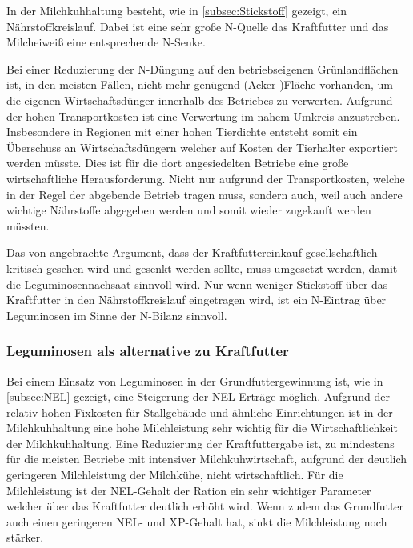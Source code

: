 In der Milchkuhhaltung besteht, wie in \cref{subsec:Stickstoff} gezeigt, ein Nährstoffkreislauf.
Dabei ist eine sehr große N-Quelle das Kraftfutter und das Milcheiweiß eine entsprechende N-Senke.

Bei einer Reduzierung der N-Düngung auf den betriebseigenen Grünlandflächen ist, in den meisten Fällen, nicht mehr genügend (Acker-)Fläche vorhanden, um die eigenen Wirtschaftsdünger innerhalb des Betriebes zu verwerten.
Aufgrund der hohen Transportkosten ist eine Verwertung im nahem Umkreis anzustreben.
Insbesondere in Regionen mit einer hohen Tierdichte entsteht somit ein Überschuss an Wirtschaftsdüngern welcher auf Kosten der Tierhalter exportiert werden müsste.
Dies ist für die dort angesiedelten Betriebe eine große wirtschaftliche Herausforderung.
Nicht nur aufgrund der Transportkosten, welche in der Regel der abgebende Betrieb tragen muss, sondern auch, weil auch andere wichtige Nährstoffe abgegeben werden und somit wieder zugekauft werden müssten.

Das von \textcite[33]{weggler2050leguminosen} angebrachte Argument, dass der Kraftfuttereinkauf gesellschaftlich kritisch gesehen wird und gesenkt werden sollte, muss umgesetzt werden, damit die Leguminosennachsaat sinnvoll wird.
Nur wenn weniger Stickstoff über das Kraftfutter in den Nährstoffkreislauf eingetragen wird, ist ein N-Eintrag über Leguminosen im Sinne der N-Bilanz sinnvoll.

\subsubsection{Leguminosen als alternative zu Kraftfutter}
\label{subsub:alternative}
Bei einem Einsatz von Leguminosen in der Grundfuttergewinnung ist, wie in \cref{subsec:NEL} gezeigt, eine Steigerung der \ac{NEL}-Erträge möglich.
Aufgrund der relativ hohen Fixkosten für Stallgebäude und ähnliche Einrichtungen ist in der Milchkuhhaltung eine hohe Milchleistung sehr wichtig für die Wirtschaftlichkeit der Milchkuhhaltung.
Eine Reduzierung der Kraftfuttergabe ist, zu mindestens für die meisten Betriebe mit intensiver Milchkuhwirtschaft, aufgrund der deutlich geringeren Milchleistung der Milchkühe, nicht wirtschaftlich.
Für die Milchleistung ist der \ac{NEL}-Gehalt der Ration ein sehr wichtiger Parameter welcher über das Kraftfutter deutlich erhöht wird.
Wenn zudem das Grundfutter auch einen geringeren \ac{NEL}- und \ac{XP}-Gehalt hat, sinkt die Milchleistung noch stärker. 

